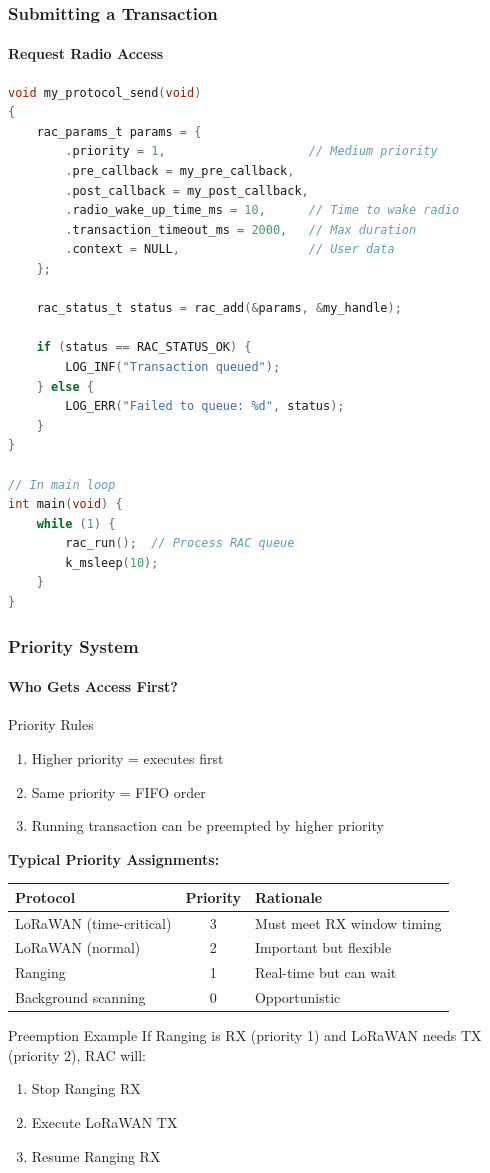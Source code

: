 \documentclass{beamer}
\begin{document}
\begin{frame}[fragile]
\frametitle{Submitting a Transaction}
\framesubtitle{Request Radio Access}

\begin{lstlisting}[language=C, basicstyle=\tiny\ttfamily]
void my_protocol_send(void)
{
    rac_params_t params = {
        .priority = 1,                    // Medium priority
        .pre_callback = my_pre_callback,
        .post_callback = my_post_callback,
        .radio_wake_up_time_ms = 10,      // Time to wake radio
        .transaction_timeout_ms = 2000,   // Max duration
        .context = NULL,                  // User data
    };

    rac_status_t status = rac_add(&params, &my_handle);

    if (status == RAC_STATUS_OK) {
        LOG_INF("Transaction queued");
    } else {
        LOG_ERR("Failed to queue: %d", status);
    }
}

// In main loop
int main(void) {
    while (1) {
        rac_run();  // Process RAC queue
        k_msleep(10);
    }
}
\end{lstlisting}
\end{frame}

\begin{frame}
\frametitle{Priority System}
\framesubtitle{Who Gets Access First?}

\begin{block}{Priority Rules}
\begin{enumerate}
    \item Higher priority = executes first
    \item Same priority = FIFO order
    \item Running transaction can be preempted by higher priority
\end{enumerate}
\end{block}

\textbf{Typical Priority Assignments:}
\begin{table}
\small
\begin{tabular}{|l|c|l|}
\hline
\textbf{Protocol} & \textbf{Priority} & \textbf{Rationale} \\
\hline
LoRaWAN (time-critical) & 3 & Must meet RX window timing \\
LoRaWAN (normal) & 2 & Important but flexible \\
Ranging & 1 & Real-time but can wait \\
Background scanning & 0 & Opportunistic \\
\hline
\end{tabular}
\end{table}

\begin{exampleblock}{Preemption Example}
If Ranging is RX (priority 1) and LoRaWAN needs TX (priority 2), RAC will:
\begin{enumerate}
    \item Stop Ranging RX
    \item Execute LoRaWAN TX
    \item Resume Ranging RX
\end{enumerate}
\end{exampleblock}
\end{frame}
\end{document}
